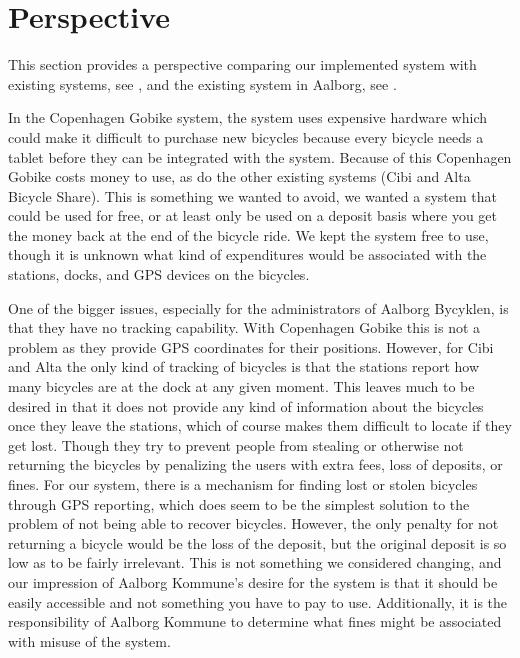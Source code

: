 \section{Perspective}
This section provides a perspective comparing our implemented system with existing systems, see , and the existing system in Aalborg, see .

In the Copenhagen Gobike system, the system uses expensive hardware which could make it difficult to purchase new bicycles because every bicycle needs a tablet before they can be integrated with the system.
Because of this Copenhagen Gobike costs money to use, as do the other existing systems (Cibi and Alta Bicycle Share). 
This is something we wanted to avoid, we wanted a system that could be used for free, or at least only be used on a deposit basis where you get the money back at the end of the bicycle ride. 
We kept the system free to use, though it is unknown what kind of expenditures would be associated with the stations, docks, and GPS devices on the bicycles. 

One of the bigger issues, especially for the administrators of Aalborg Bycyklen, is that they have no tracking capability. 
With Copenhagen Gobike this is not a problem as they provide GPS coordinates for their positions.
However, for Cibi and Alta the only kind of tracking of bicycles is that the stations report how many bicycles are at the dock at any given moment.
This leaves much to be desired in that it does not provide any kind of information about the bicycles once they leave the stations, which of course makes them difficult to locate if they get lost.
Though they try to prevent people from stealing or otherwise not returning the bicycles by penalizing the users with extra fees, loss of deposits, or fines.
For our system, there is a mechanism for finding lost or stolen bicycles through GPS reporting, which does seem to be the simplest solution to the problem of not being able to recover bicycles.
However, the only penalty for not returning a bicycle would be the loss of the deposit, but the original deposit is so low as to be fairly irrelevant.
This is not something we considered changing, and our impression of Aalborg Kommune's desire for the system is that it should be easily accessible and not something you have to pay to use.
Additionally, it is the responsibility of Aalborg Kommune to determine what fines might be associated with misuse of the system.

